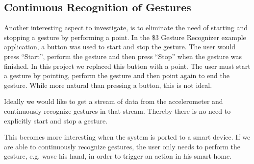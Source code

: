 \subsection{Continuous Recognition of Gestures}

Another interesting aspect to investigate, is to eliminate the need of starting and stopping a gesture by performing a point. In the \$3 Gesture Recognizer example application, a button was used to start and stop the gesture. The user would press ``Start'', perform the gesture and then press ``Stop'' when the gesture was finished. In this project we replaced this button with a point. The user must start a gesture by pointing, perform the gesture and then point again to end the gesture. While more natural than pressing a button, this is not ideal.

Ideally we would like to get a stream of data from the accelerometer and continuously recognize gestures in that stream. Thereby there is no need to explicitly start and stop a gesture.

This becomes more interesting when the system is ported to a smart device. If we are able to continuously recognize gestures, the user only needs to perform the gesture, e.g. wave his hand, in order to trigger an action in his smart home.

